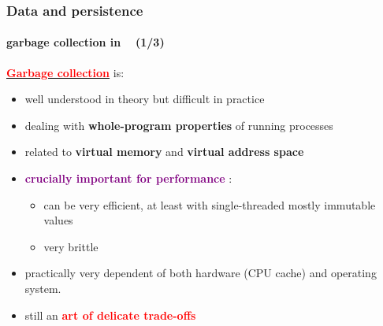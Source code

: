 \documentclass[xcolor=svgnames,final,smaller,a4]{beamer}
\begin{document}
\begin{frame}
    \frametitle{Data and persistence}
    \framesubtitle{garbage collection in \Bismon ~ (1/3)}

    {\href{http://gchandbook.org/}{\textcolor{red}{\textbf{Garbage
          collection}}}} is:
    \begin{itemize}
    \item well understood in theory but difficult in practice
    \item dealing with \textbf{whole-program properties} of running processes
    \item related to \textbf{virtual memory} and \textbf{virtual address space}
    \item \textcolor{purple}{\textbf{crucially important for performance}} : \begin{itemize}
    \item can be very efficient, at least with single-threaded mostly
      immutable values {}
      \item very brittle {}
    \end{itemize}
      
      \item practically very dependent of both hardware (CPU cache)
        and operating system.

        \item still an \textcolor{red}{\textbf{art of delicate trade-offs}} {}
        
    \end{itemize}
\end{frame}
\end{document}
